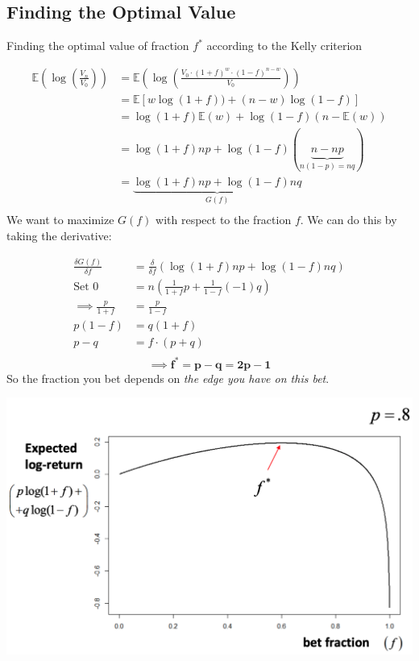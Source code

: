 \documentclass[
  oneside]{book}
\begin{document}
\hypertarget{finding-the-optimal-value}{%
\subsection{Finding the Optimal Value}\label{finding-the-optimal-value}}

Finding the optimal value of fraction \(f^{*}\) according to the Kelly criterion

\[
\begin{aligned}
\mathbb{E}\left( \log\left( \frac{V_{n}}{V_{0}} \right) \right) &= \mathbb{E}\left( \log\left( \frac{V_{0}\cdot(1+f)^{w}\cdot(1-f)^{n-w}}{V_{0}} \right) \right)\\
&= \mathbb{E}[w\log(1+f))+(n-w)\log(1-f)]\\
&= \log(1+f)\mathbb{E}(w) + \log(1-f)(n-\mathbb{E}(w))\\
&= \log(1+f)np+\log(1-f)(\underbrace{ n-np }_{ n(1-p)=nq })\\
&= \underbrace{ \log(1+f)np+\log(1-f)nq }_{ G(f) }\\
\end{aligned}
\]
We want to maximize \(G(f)\) with respect to the fraction \(f\). We can do this by taking the derivative:

\[
\begin{aligned}
\frac{\delta G(f)}{\delta f} &= \frac{\delta}{\delta f}(\log(1+f)np+\log(1-f)nq)\\
\text{Set } 0 &= n\left( \frac{1}{1+f}p+\frac{1}{1-f}(-1)q \right)\\
\implies \frac{p}{1+f}&=\frac{p}{1-f}\\
p(1-f)&=q(1+f)\\
p-q&=f\cdot(p+q)\\
\end{aligned}
\]
\[
\mathbf{\implies f^{*} = p-q = 2p-1}
\]
So the fraction you bet depends on \emph{the edge you have on this bet}.

\includegraphics{Notes/Obsidian-Attachments/8-Betting-Strategies.png}
\end{document}
